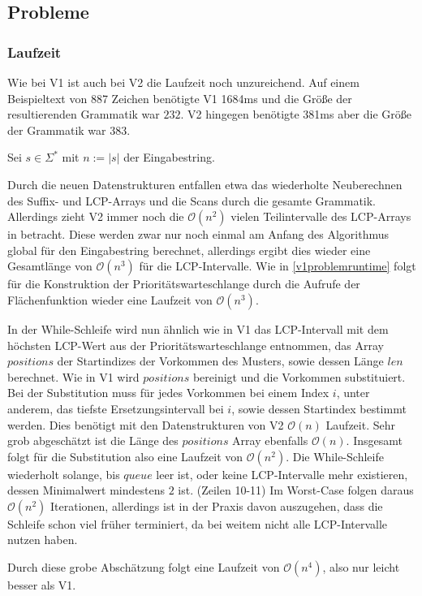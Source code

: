 \subsection{Probleme}

\subsubsection{Laufzeit}

Wie bei V1 ist auch bei V2 die Laufzeit noch unzureichend. Auf einem Beispieltext von 887 Zeichen benötigte V1 1684ms und die Größe der resultierenden Grammatik war $232$. V2 hingegen benötigte 381ms aber die Größe der Grammatik war $383$. 

Sei $s \in \Sigma^*$ mit $n := |s|$ der Eingabestring.

Durch die neuen Datenstrukturen entfallen etwa das wiederholte Neuberechnen des Suffix- und LCP-Arrays und die Scans durch die gesamte Grammatik.
Allerdings zieht V2 immer noch die $\mathcal{O}(n^2)$ vielen Teilintervalle des LCP-Arrays in betracht. Diese werden zwar nur noch einmal am Anfang des Algorithmus global für den Eingabestring berechnet, allerdings ergibt dies wieder eine Gesamtlänge von $\mathcal{O}(n^3)$ für die LCP-Intervalle. Wie in \autoref{v1problemruntime} folgt für die Konstruktion der Prioritätswarteschlange durch die Aufrufe der Flächenfunktion wieder eine Laufzeit von $\mathcal{O}(n^3)$.

In der While-Schleife wird nun ähnlich wie in V1 das LCP-Intervall mit dem höchsten LCP-Wert aus der Prioritätswarteschlange entnommen, das Array $positions$ der Startindizes der Vorkommen des Musters, sowie dessen Länge $len$ berechnet. 
Wie in V1 wird $positions$ bereinigt und die Vorkommen substituiert. Bei der Substitution muss für jedes Vorkommen bei einem Index $i$, unter anderem, das tiefste Ersetzungsintervall bei $i$, sowie dessen Startindex bestimmt werden. 
Dies benötigt mit den Datenstrukturen von V2 $\mathcal{O}(n)$ Laufzeit. Sehr grob abgeschätzt ist die Länge des $positions$ Array ebenfalls $\mathcal{O}(n)$. Insgesamt folgt für die Substitution also eine Laufzeit von $\mathcal{O}(n^2)$. Die While-Schleife wiederholt solange, bis $queue$ leer ist, oder keine LCP-Intervalle mehr existieren, dessen Minimalwert mindestens $2$ ist. (Zeilen 10-11) Im Worst-Case folgen daraus $\mathcal{O}(n^2)$ Iterationen, allerdings ist in der Praxis davon auszugehen, dass die Schleife schon viel früher terminiert, da bei weitem nicht alle LCP-Intervalle nutzen haben.

Durch diese grobe Abschätzung folgt eine Laufzeit von $\mathcal{O}(n^4)$, also nur leicht besser als V1.